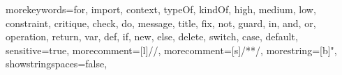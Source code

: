 {morekeywords={for, import, context, typeOf, kindOf, high, medium, low, constraint, critique, check, do, message, title, fix, not, guard, in, and, or, operation, return, var, def, if, new, else, delete, switch, case, default},
sensitive=true,
morecomment=[l]{//},
morecomment=[s]{/*}{*/},
morestring=[b]",
showstringspaces=false,
}
